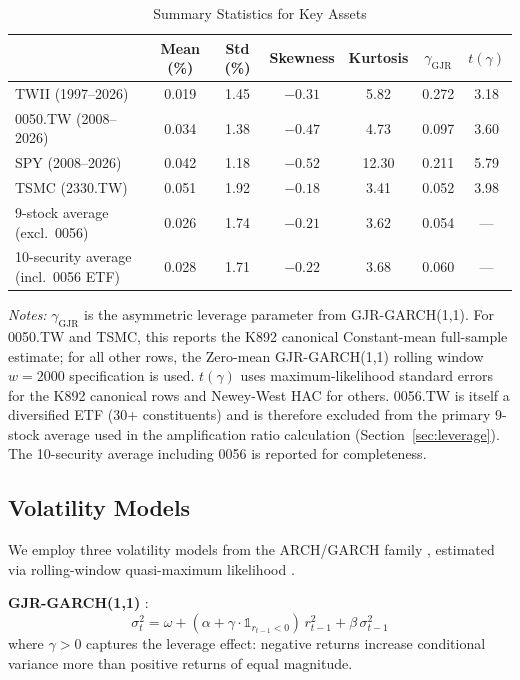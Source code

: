 \begin{table}[H]
\centering
\caption{Summary Statistics for Key Assets}
\label{tab:summary_stats}
\begin{tabular}{lcccccc}
\toprule
& Mean (\%) & Std (\%) & Skewness & Kurtosis & $\gamma_{\text{GJR}}$ & $t(\gamma)$ \\
\midrule
TWII (1997--2026) & 0.019 & 1.45 & $-0.31$ & 5.82 & 0.272 & 3.18 \\
0050.TW (2008--2026) & 0.034 & 1.38 & $-0.47$ & 4.73 & 0.097 & 3.60 \\
SPY (2008--2026) & 0.042 & 1.18 & $-0.52$ & 12.30 & 0.211 & 5.79 \\
TSMC (2330.TW) & 0.051 & 1.92 & $-0.18$ & 3.41 & 0.052 & 3.98 \\
9-stock average (excl.\ 0056) & 0.026 & 1.74 & $-0.21$ & 3.62 & 0.054 & --- \\
10-security average (incl.\ 0056 ETF) & 0.028 & 1.71 & $-0.22$ & 3.68 & 0.060 & --- \\
\bottomrule
\end{tabular}
\begin{flushleft}
\small \textit{Notes:} $\gamma_{\text{GJR}}$ is the asymmetric leverage parameter from GJR-GARCH(1,1). For 0050.TW and TSMC, this reports the K892 canonical Constant-mean full-sample estimate; for all other rows, the Zero-mean GJR-GARCH(1,1) rolling window $w = 2000$ specification is used. $t(\gamma)$ uses maximum-likelihood standard errors for the K892 canonical rows and Newey-West HAC for others. 0056.TW is itself a diversified ETF (30+ constituents) and is therefore excluded from the primary 9-stock average used in the amplification ratio calculation (Section~\ref{sec:leverage}). The 10-security average including 0056 is reported for completeness.
\end{flushleft}
\end{table}

\subsection{Volatility Models}

We employ three volatility models from the ARCH/GARCH family \citep{engle1982,bollerslev1986}, estimated via rolling-window quasi-maximum likelihood \citep{bollerslev1992}.

\textbf{GJR-GARCH(1,1)} \citep{glosten1993}:
\begin{equation}
\sigma_t^2 = \omega + (\alpha + \gamma \cdot \mathbb{1}_{r_{t-1}<0}) \, r_{t-1}^2 + \beta \, \sigma_{t-1}^2
\label{eq:gjr}
\end{equation}
where $\gamma > 0$ captures the leverage effect: negative returns increase conditional variance more than positive returns of equal magnitude.

